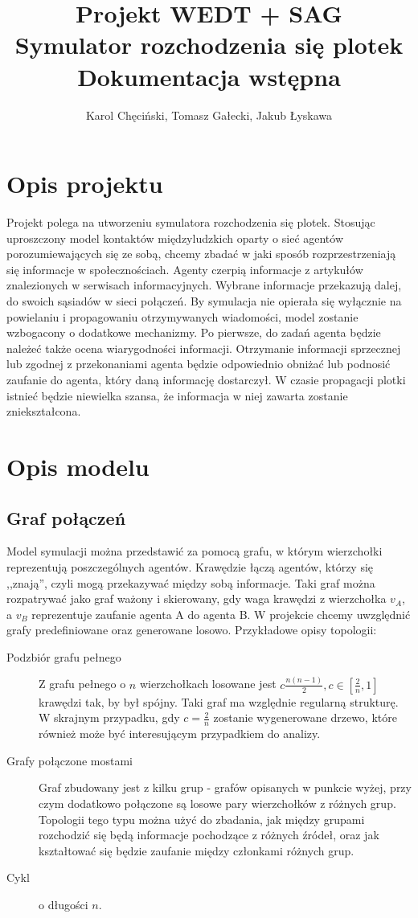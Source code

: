 \documentclass{article}
\title{Projekt WEDT + SAG \\ Symulator rozchodzenia się plotek \\ Dokumentacja wstępna}
\author{Karol Chęciński, Tomasz Gałecki, Jakub Łyskawa}
\begin{document}
	\maketitle
	\section{Opis projektu}
		Projekt polega na utworzeniu symulatora rozchodzenia się plotek. Stosując uproszczony model kontaktów międzyludzkich oparty o sieć agentów porozumiewających się ze sobą, chcemy zbadać w jaki sposób rozprzestrzeniają się informacje w społecznościach. Agenty czerpią informacje z artykułów znalezionych w serwisach informacyjnych. Wybrane informacje przekazują dalej, do swoich sąsiadów w sieci połączeń. 
		By symulacja nie opierała się wyłącznie na powielaniu i propagowaniu otrzymywanych wiadomości, model zostanie wzbogacony o dodatkowe mechanizmy. Po pierwsze, do zadań agenta będzie należeć także ocena wiarygodności informacji. Otrzymanie informacji sprzecznej lub zgodnej z przekonaniami agenta będzie odpowiednio obniżać lub podnosić zaufanie do agenta, który daną informację dostarczył. W czasie propagacji plotki istnieć będzie niewielka szansa, że informacja w niej zawarta zostanie zniekształcona. 
	\section{Opis modelu}
	\subsection{Graf połączeń}
		Model symulacji można przedstawić za pomocą grafu, w którym wierzchołki reprezentują poszczególnych agentów. Krawędzie łączą agentów, którzy się ,,znają'', czyli mogą przekazywać między sobą informacje. Taki graf można rozpatrywać jako graf ważony i skierowany, gdy waga krawędzi z wierzchołka $v_A$, a $v_B$ reprezentuje zaufanie agenta A do agenta B.
		W projekcie chcemy uwzględnić grafy predefiniowane oraz generowane losowo. Przykładowe opisy topologii:
		\begin{description}
		\item[Podzbiór grafu pełnego]
		Z grafu pełnego o $n$ wierzchołkach losowane jest $c\frac{n(n-1)}{2}, c \in [\frac{2}{n}, 1]$ krawędzi tak, by był spójny. Taki graf ma względnie regularną strukturę. W skrajnym przypadku, gdy $c = \frac{2}{n}$ zostanie wygenerowane drzewo, które również może być interesującym przypadkiem do analizy.
		\item[Grafy połączone mostami]
		Graf zbudowany jest z kilku grup - grafów opisanych w punkcie wyżej, przy czym dodatkowo połączone są losowe pary wierzchołków z różnych grup. Topologii tego typu można użyć do zbadania, jak między grupami rozchodzić się będą informacje pochodzące z różnych źródeł, oraz jak kształtować się będzie zaufanie między członkami różnych grup.
		\item [Cykl] o długości $n$.
		\end{description}
\end{document}
